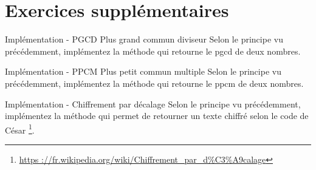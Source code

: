 \documentclass[a4paper,11pt]{style-esi/td}
\begin{document}
\clearpage
\section{Exercices supplémentaires}
	\begin{Exercice}{Implémentation - PGCD Plus grand commun diviseur}
		Selon le principe vu précédemment, implémentez la méthode  qui retourne le pgcd de deux nombres.
	\end{Exercice}

	\begin{Exercice}{Implémentation - PPCM Plus petit commun multiple}
		Selon le principe vu précédemment, implémentez la méthode  qui retourne le ppcm de deux nombres.
	\end{Exercice}

	\begin{Exercice}{Implémentation - Chiffrement par décalage}
		Selon le principe vu précédemment, implémentez la méthode  qui permet de retourner un texte chiffré selon le code de César%
		\footnote{%
			\url{https ://fr.wikipedia.org/wiki/Chiffrement\_par\_d\%C3\%A9calage}
		}.
		
	\end{Exercice}
\end{document}
